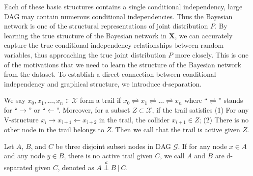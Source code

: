 \documentclass[twoside,11pt]{article}
\begin{document}
Each of these basic structures contains a single conditional independency, large DAG may contain numerous conditional independencies. Thus the Bayesian network is one of the structural representations of joint distribution $P$. 
By learning the true structure of the Bayesian network in $\mathbf X$, we can accurately capture the true conditional independency relationships between random variables, thus approaching the true joint distribution $P$ more closely. This is one of the motivations that we need to learn the structure of the Bayesian network from the dataset.
To establish a direct connection between conditional independency and graphical structure, we introduce d-separation.
\begin{definition}
We say $x_0, x_1, ..., x_n\in \mathcal X$ form a trail if $x_0 \rightleftharpoons x_1\rightleftharpoons...\rightleftharpoons x_n$ where ``$\rightleftharpoons$'' stands for ``$\to$'' or ``$\gets$''. Moreover, for a subset $Z\subset \mathcal X$, if the trail satisfies (1) For any V-structure $x_i\to x_{i+1} \gets x_{i+2}$ in the trail, the collider $x_{i+1} \in Z$; (2) There is no other node in the trail belongs to $Z$. Then we call that the trail is active given $Z$.
\end{definition}

\begin{definition}
Let $A$, $B$, and $C$ be three disjoint subset nodes in DAG $\mathcal G$. If for any node $x\in A$ and any node $y\in B$, there is no active trail given $C$, we call $A$ and $B$ are d-separated given $C$, denoted as $A \overset{d}{\perp} B\ |\ C$.
\end{definition}
\end{document}

